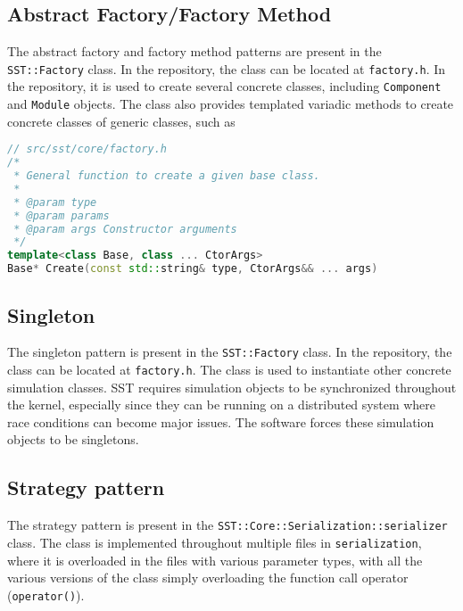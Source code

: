\documentclass[titlepage]{article}
\begin{document}
\subsection{Abstract Factory/Factory Method}
The abstract factory and factory method patterns are present in the \texttt{SST::Factory} class. In the repository, the class can be located at \texttt{factory.h}. In the repository, it is used to create several concrete classes, including \texttt{Component} and \texttt{Module} objects. The class also provides templated variadic methods to create concrete classes of generic classes, such as
\begin{lstlisting}[language=c++]
// src/sst/core/factory.h
/*
 * General function to create a given base class.
 *
 * @param type
 * @param params
 * @param args Constructor arguments
 */
template<class Base, class ... CtorArgs>
Base* Create(const std::string& type, CtorArgs&& ... args)
\end{lstlisting}

\subsection{Singleton}
The singleton pattern is present in the \texttt{SST::Factory} class. In the repository, the class can be located at \texttt{factory.h}. The class is used to instantiate other concrete simulation classes. SST requires simulation objects to be synchronized throughout the kernel, especially since they can be running on a distributed system where race conditions can become major issues. The software forces these simulation objects to be singletons.

\subsection{Strategy pattern}

The strategy pattern is present in the \texttt{SST::Core::Serialization::serializer} class. The class is implemented throughout multiple files in \texttt{serialization}, where it is overloaded in the files with various parameter types, with all the various versions of the class simply overloading the function call operator (\texttt{operator()}).



\end{document}
